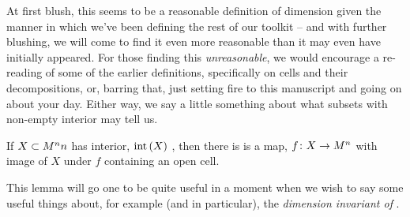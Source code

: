 At first blush, this seems to be a reasonable definition of dimension given the manner in which we've been defining the rest of our toolkit -- and with further blushing, we will come to find it even more reasonable than it may even have initially appeared. For those finding this \emph{unreasonable}, we would encourage a re-reading of some of the earlier definitions, specifically on cells and their decompositions, or, barring that, just setting fire to this manuscript and going on about your day. Either way, we say a little something about what subsets with non-empty interior may tell us.

\begin{lemma}
  \label{lemma:interior-open-cell}
  If $X \subset M^{n}{n}$ has interior, $\operatorname{int}\left(X\right)$ \inhb, then there is is a  \inj map, $f \colon X \to M^n$ with image of $X$ under $f$ containing an open cell.
\end{lemma}
This lemma will go one to be quite useful in a moment when we wish to say some useful things about, for example (and in particular), the \emph{dimension invariant of  \bijtions }.

